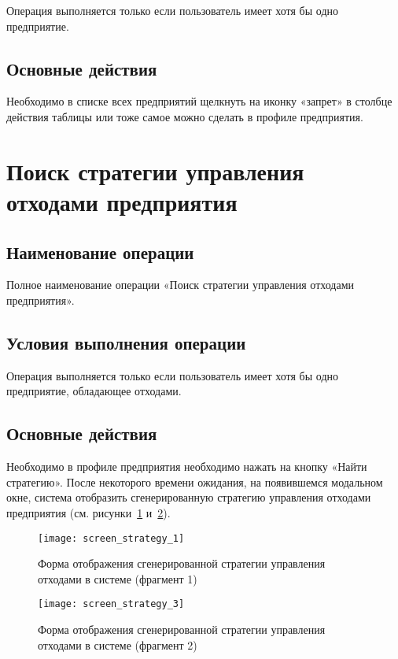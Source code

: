 \documentclass[a4paper]{G2-105}
\begin{document}
Операция выполняется только если пользователь имеет хотя бы одно предприятие.

\subsection{Основные действия}

Необходимо в списке всех предприятий щелкнуть на иконку «запрет» в столбце действия таблицы или тоже самое можно сделать в профиле предприятия.

\section{Поиск стратегии управления отходами предприятия}

\ttl

\subsection{Наименование операции}

Полное наименование операции «Поиск стратегии управления отходами предприятия».

\subsection{Условия выполнения операции}

Операция выполняется только если пользователь имеет хотя бы одно предприятие, обладающее отходами.

\subsection{Основные действия}

Необходимо в профиле предприятия необходимо нажать на кнопку «Найти стратегию». После некоторого времени ожидания, на появившемся модальном окне, система отобразить сгенерированную стратегию управления отходами предприятия (см. рисунки~\ref{fig:screen_strategy_1} и~\ref{fig:screen_strategy_3}).

\begin{figure}[H]
\centering
\texttt{[image: screen\_strategy\_1]}
\caption{Форма отображения сгенерированной стратегии управления отходами в системе (фрагмент 1)}
\label{fig:screen_strategy_1}
\end{figure}

\begin{figure}[H]
\centering
\texttt{[image: screen\_strategy\_3]}
\caption{Форма отображения сгенерированной стратегии управления отходами в системе (фрагмент 2)}
\label{fig:screen_strategy_3}
\end{figure}
\end{document}

